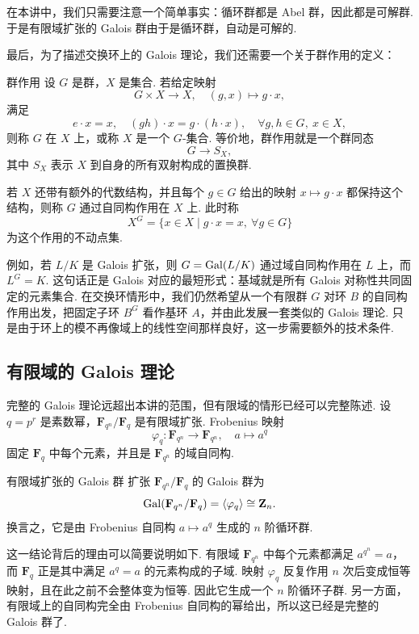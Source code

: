 在本讲中，我们只需要注意一个简单事实：循环群都是 Abel 群，因此都是可解群. 于是有限域扩张的 Galois 群由于是循环群，自动是可解的.

最后，为了描述交换环上的 Galois 理论，我们还需要一个关于群作用的定义：

\begin{definition}{群作用}{}
    设 $G$ 是群，$X$ 是集合. 若给定映射
    \[
        G\times X\to X,\quad (g,x)\mapsto g\cdot x,
    \]
    满足
    \[
        e\cdot x=x,\quad (gh)\cdot x=g\cdot(h\cdot x),
        \quad \forall g,h\in G,\ x\in X,
    \]
    则称 $G$ 在 $X$ 上，或称 $X$ 是一个 $G$-集合. 等价地，群作用就是一个群同态
    \[
        G\to S_X,
    \]
    其中 $S_X$ 表示 $X$ 到自身的所有双射构成的置换群.

    若 $X$ 还带有额外的代数结构，并且每个 $g\in G$ 给出的映射 $x\mapsto g\cdot x$ 都保持这个结构，则称 $G$ 通过自同构作用在 $X$ 上. 此时称
    \[
        X^G=\{x\in X\mid g\cdot x=x,\ \forall g\in G\}
    \]
    为这个作用的不动点集.
\end{definition}

例如，若 $L/K$ 是 Galois 扩张，则 $G=\operatorname{Gal}(L/K)$ 通过域自同构作用在 $L$ 上，而 $L^G=K$. 这句话正是 Galois 对应的最短形式：基域就是所有 Galois 对称性共同固定的元素集合. 在交换环情形中，我们仍然希望从一个有限群 $G$ 对环 $B$ 的自同构作用出发，把固定子环 $B^G$ 看作基环 $A$，并由此发展一套类似的 Galois 理论. 只是由于环上的模不再像域上的线性空间那样良好，这一步需要额外的技术条件.

\subsection{有限域的 Galois 理论}

完整的 Galois 理论远超出本讲的范围，但有限域的情形已经可以完整陈述. 设 $q=p^r$ 是素数幂，$\mathbf{F}_{q^n}/\mathbf{F}_q$ 是有限域扩张. Frobenius 映射
\[
    \varphi_q\colon \mathbf{F}_{q^n}\to\mathbf{F}_{q^n},\quad a\mapsto a^q
\]
固定 $\mathbf{F}_q$ 中每个元素，并且是 $\mathbf{F}_{q^n}$ 的域自同构.

\begin{theorem}{有限域扩张的 Galois 群}{}
    扩张 $\mathbf{F}_{q^n}/\mathbf{F}_q$ 的 Galois 群为
    \[
        \operatorname{Gal}(\mathbf{F}_{q^n}/\mathbf{F}_q)
        =\langle\varphi_q\rangle
        \cong \mathbf{Z}_n.
    \]
    换言之，它是由 Frobenius 自同构 $a\mapsto a^q$ 生成的 $n$ 阶循环群.
\end{theorem}

这一结论背后的理由可以简要说明如下. 有限域 $\mathbf{F}_{q^n}$ 中每个元素都满足 $a^{q^n}=a$，而 $\mathbf{F}_q$ 正是其中满足 $a^q=a$ 的元素构成的子域. 映射 $\varphi_q$ 反复作用 $n$ 次后变成恒等映射，且在此之前不会整体变为恒等. 因此它生成一个 $n$ 阶循环子群. 另一方面，有限域上的自同构完全由 Frobenius 自同构的幂给出，所以这已经是完整的 Galois 群了.

